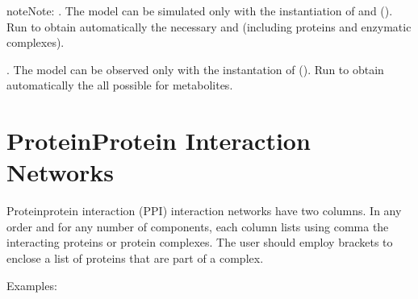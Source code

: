 \documentclass[letterpaper,10pt,english]{sphinxmanual}
\begin{document}
\begin{sphinxadmonition}{note}{Note:}
. The model can be simulated only with the instantiation of
 and  ().
Run  to obtain
automatically the necessary  and  (including
proteins and enzymatic complexes).

. The model can be observed only with the instantation of
 ().
Run  to obtain
automatically the all possible  for metabolites.
\end{sphinxadmonition}


\section{Protein\sphinxhyphen{}Protein Interaction Networks}
\label{\detokenize{NetProteinProtein:protein-protein-interaction-networks}}\label{\detokenize{NetProteinProtein:net-proteinprotein}}\label{\detokenize{NetProteinProtein::doc}}
Protein\sphinxhyphen{}protein interaction (PPI) interaction networks have two columns. In any
order and for any number of components, each column lists using comma the
interacting proteins or protein complexes. The user should employ brackets to
enclose a list of proteins that are part of a complex.

Examples:

\begin{sphinxVerbatim}[commandchars=\\\{\},numbers=left,firstnumber=1,stepnumber=1]
	
	
	
\end{sphinxVerbatim}

\end{document}
